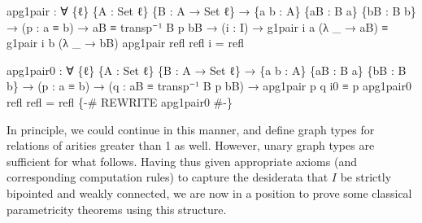 \documentclass[
  12pt]{article}
\newenvironment{Shaded}{\begin{snugshade}}{\end{snugshade}}
\newcommand{\DataTypeTok}[1]{\textcolor[rgb]{0.00,0.34,0.68}{#1}}
\newcommand{\NormalTok}[1]{\textcolor[rgb]{0.12,0.11,0.11}{#1}}
\newcommand{\OtherTok}[1]{\textcolor[rgb]{0.00,0.43,0.16}{#1}}
\newcommand{\PreprocessorTok}[1]{\textcolor[rgb]{0.00,0.43,0.16}{#1}}
\begin{document}
\begin{Shaded}
\begin{Highlighting}[]
\NormalTok{apg1pair }\OtherTok{:} \OtherTok{∀} \OtherTok{\{}\NormalTok{ℓ}\OtherTok{\}} \OtherTok{\{}\NormalTok{A }\OtherTok{:} \DataTypeTok{Set}\NormalTok{ ℓ}\OtherTok{\}} \OtherTok{\{}\NormalTok{B }\OtherTok{:}\NormalTok{ A }\OtherTok{→} \DataTypeTok{Set}\NormalTok{ ℓ}\OtherTok{\}}
           \OtherTok{→} \OtherTok{\{}\NormalTok{a b }\OtherTok{:}\NormalTok{ A}\OtherTok{\}} \OtherTok{\{}\NormalTok{aB }\OtherTok{:}\NormalTok{ B a}\OtherTok{\}} \OtherTok{\{}\NormalTok{bB }\OtherTok{:}\NormalTok{ B b}\OtherTok{\}} 
           \OtherTok{→} \OtherTok{(}\NormalTok{p }\OtherTok{:}\NormalTok{ a ≡ b}\OtherTok{)} \OtherTok{→}\NormalTok{ aB ≡ transp⁻¹ B p bB }
           \OtherTok{→} \OtherTok{(}\NormalTok{i }\OtherTok{:}\NormalTok{ I}\OtherTok{)} \OtherTok{→}\NormalTok{ g1pair i a }\OtherTok{(λ} \OtherTok{\_} \OtherTok{→}\NormalTok{ aB}\OtherTok{)}\NormalTok{ ≡ g1pair i b }\OtherTok{(λ} \OtherTok{\_} \OtherTok{→}\NormalTok{ bB}\OtherTok{)}
\NormalTok{apg1pair refl refl i }\OtherTok{=}\NormalTok{ refl}

\NormalTok{apg1pair0 }\OtherTok{:} \OtherTok{∀} \OtherTok{\{}\NormalTok{ℓ}\OtherTok{\}} \OtherTok{\{}\NormalTok{A }\OtherTok{:} \DataTypeTok{Set}\NormalTok{ ℓ}\OtherTok{\}} \OtherTok{\{}\NormalTok{B }\OtherTok{:}\NormalTok{ A }\OtherTok{→} \DataTypeTok{Set}\NormalTok{ ℓ}\OtherTok{\}}
            \OtherTok{→} \OtherTok{\{}\NormalTok{a b }\OtherTok{:}\NormalTok{ A}\OtherTok{\}} \OtherTok{\{}\NormalTok{aB }\OtherTok{:}\NormalTok{ B a}\OtherTok{\}} \OtherTok{\{}\NormalTok{bB }\OtherTok{:}\NormalTok{ B b}\OtherTok{\}}
            \OtherTok{→} \OtherTok{(}\NormalTok{p }\OtherTok{:}\NormalTok{ a ≡ b}\OtherTok{)} \OtherTok{→} \OtherTok{(}\NormalTok{q }\OtherTok{:}\NormalTok{ aB ≡ transp⁻¹ B p bB}\OtherTok{)}
            \OtherTok{→}\NormalTok{ apg1pair p q i0 ≡ p}
\NormalTok{apg1pair0 refl refl }\OtherTok{=}\NormalTok{ refl}
\PreprocessorTok{\{{-}\# REWRITE apg1pair0 \#{-}\}}
\end{Highlighting}
\end{Shaded}

In principle, we could continue in this manner, and define graph types
for relations of arities greater than 1 as well. However, unary graph
types are sufficient for what follows. Having thus given appropriate
axioms (and corresponding computation rules) to capture the desiderata
that \(I\) be strictly bipointed and weakly connected, we are now in a
position to prove some classical parametricity theorems using this
structure.
\end{document}
